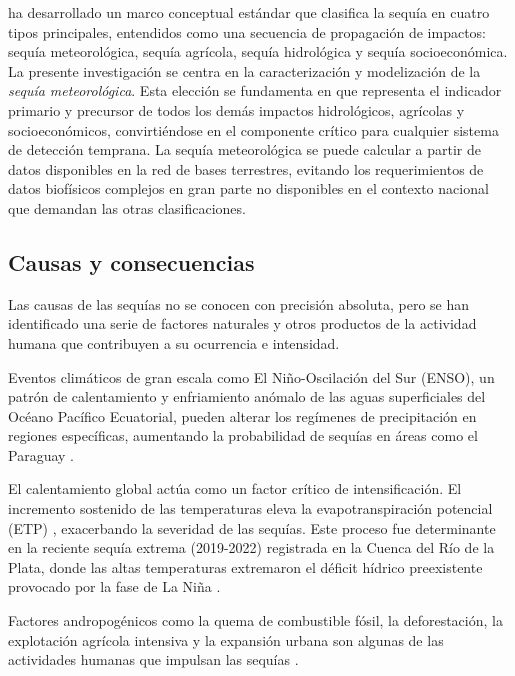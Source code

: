  ha desarrollado un marco conceptual estándar que clasifica la sequía en cuatro tipos principales, entendidos como una secuencia de propagación de impactos: sequía meteorológica, sequía agrícola, sequía hidrológica y sequía socioeconómica. La presente investigación se centra en la caracterización y modelización de la \textit{sequía meteorológica}. Esta elección se fundamenta en que representa el indicador primario y precursor de todos los demás impactos hidrológicos, agrícolas y socioeconómicos, convirtiéndose en el componente crítico para cualquier sistema de detección temprana. La sequía meteorológica se puede calcular a partir de datos disponibles en la red de bases terrestres, evitando los requerimientos de datos biofísicos complejos en gran parte no disponibles en el contexto nacional que demandan las otras clasificaciones.

\subsection{Causas y consecuencias}

Las causas de las sequías no se conocen con precisión absoluta, pero se han identificado una serie de factores naturales y otros productos de la actividad humana que contribuyen a su ocurrencia e intensidad.

Eventos climáticos de gran escala como El Niño-Oscilación del Sur (ENSO), un patrón de calentamiento y enfriamiento anómalo de las aguas superficiales del Océano Pacífico Ecuatorial, pueden alterar los regímenes de precipitación en regiones específicas, aumentando la probabilidad de sequías en áreas como el Paraguay \cite{vera2006}.

El calentamiento global actúa como un factor crítico de intensificación. El incremento sostenido de las temperaturas eleva la evapotranspiración potencial (ETP) \cite{massondelmotte2021}, exacerbando la severidad de las sequías. Este proceso fue determinante en la reciente sequía extrema (2019-2022) registrada en la Cuenca del Río de la Plata, donde las altas temperaturas extremaron el déficit hídrico preexistente provocado por la fase de La Niña \cite{naumann2023}.

Factores andropogénicos como la quema de combustible fósil, la deforestación, la explotación agrícola intensiva y la expansión urbana son algunas de las actividades humanas que impulsan las sequías \cite{velasco2005sequia}.

